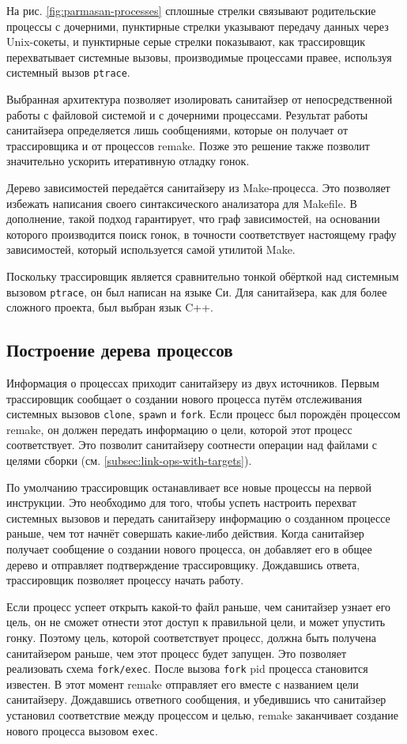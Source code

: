 На рис. \ref{fig:parmasan-processes} сплошные стрелки связывают родительские процессы с дочерними, пунктирные стрелки указывают передачу данных через Unix-сокеты, и пунктирные серые стрелки показывают, как трассировщик перехватывает системные вызовы, производимые процессами правее, используя системный вызов \texttt{ptrace}.

Выбранная архитектура позволяет изолировать санитайзер от непосредственной работы с файловой системой и с дочерними процессами. Результат работы санитайзера определяется лишь сообщениями, которые он получает от трассировщика и от процессов remake. Позже это решение также позволит значительно ускорить итеративную отладку гонок.

Дерево зависимостей передаётся санитайзеру из Make-процесса. Это позволяет избежать написания своего синтаксического анализатора для Makefile. В дополнение, такой подход гарантирует, что граф зависимостей, на основании которого производится поиск гонок, в точности соответствует настоящему графу зависимостей, который используется самой утилитой Make.

Поскольку трассировщик является сравнительно тонкой обёрткой над системным вызовом \texttt{ptrace}, он был написан на языке Си. Для санитайзера, как для более сложного проекта, был выбран язык C++.

\subsection{Построение дерева процессов}

Информация о процессах приходит санитайзеру из двух источников. Первым трассировщик сообщает о создании нового процесса путём отслеживания системных вызовов \texttt{clone}, \texttt{spawn} и \texttt{fork}. Если процесс был порождён процессом remake, он должен передать информацию о цели, которой этот процесс соответствует. Это позволит санитайзеру соотнести операции над файлами с целями сборки (см. \ref{subsec:link-ops-with-targets}).

По умолчанию трассировщик останавливает все новые процессы на первой инструкции. Это необходимо для того, чтобы успеть настроить перехват системных вызовов и передать санитайзеру информацию о созданном процессе раньше, чем тот начнёт совершать какие-либо действия. Когда санитайзер получает сообщение о создании нового процесса, он добавляет его в общее дерево и отправляет подтверждение трассировщику. Дождавшись ответа, трассировщик позволяет процессу начать работу.

Если процесс успеет открыть какой-то файл раньше, чем санитайзер узнает его цель, он не сможет отнести этот доступ к правильной цели, и может упустить гонку. Поэтому цель, которой соответствует процесс, должна быть получена санитайзером раньше, чем этот процесс будет запущен. Это позволяет реализовать схема \texttt{fork/exec}. После вызова \texttt{fork} pid процесса становится известен. В этот момент remake отправляет его вместе с названием цели санитайзеру. Дождавшись ответного сообщения, и убедившись что санитайзер установил соответствие между процессом и целью, remake заканчивает создание нового процесса вызовом \texttt{exec}.

